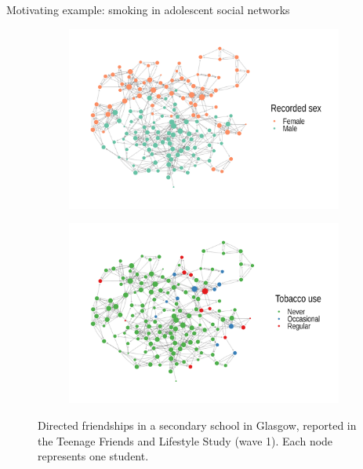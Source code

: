 \documentclass[final]{beamer}
\newlength{\colwidth}
\begin{document}
\begin{frame}[t]
\begin{columns}[t]
\begin{column}{\colwidth}
\begin{block}{Motivating example: smoking in adolescent social networks}
                \begin{figure}[ht!]
                    \begin{subfigure}{0.49\textwidth}
                        \centering
                        \includegraphics[width=\textwidth]{figures/glasgow/sex.png}
                    \end{subfigure}
                    \begin{subfigure}{0.49\textwidth}
                        \centering
                        \includegraphics[width=\textwidth]{figures/glasgow/tobacco.png}
                    \end{subfigure}
                    \caption{Directed friendships in a secondary school in Glasgow, reported in the Teenage Friends and Lifestyle Study (wave 1). Each node represents one student.}
                    \label{fig:glasgow}
                \end{figure}


\end{block}
\end{column}
\end{columns}
\end{frame}
\end{document}

